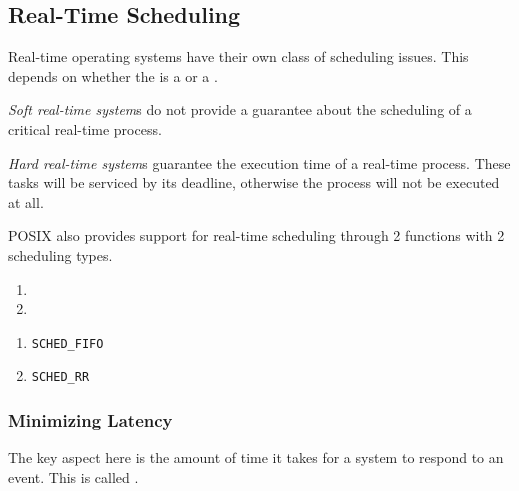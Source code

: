 \subsection{Real-Time Scheduling}\label{subsec:Real_Time_Scheduling}
Real-time operating systems have their own class of scheduling issues.
This depends on whether the  is a  or a .

\begin{definition}\label{def:Soft_Real_Time_System}
  \emph{Soft real-time system}s do not provide a guarantee about the scheduling of a critical real-time process.
\end{definition}

\begin{definition}\label{def:Hard_Real_Time_System}
  \emph{Hard real-time system}s guarantee the execution time of a real-time process.
  These tasks will be serviced by its deadline, otherwise the process will not be executed at all.
\end{definition}

POSIX also provides support for real-time scheduling through 2 functions with 2 scheduling types.
\begin{enumerate}[noitemsep]
\item {}
\item {}
\end{enumerate}
\begin{enumerate}[noitemsep]
\item \texttt{SCHED\_FIFO}
\item \texttt{SCHED\_RR}
\end{enumerate}

\subsubsection{Minimizing Latency}\label{subsubsec:Minimizing_Latency}
The key aspect here is the amount of time it takes for a system to respond to an event.
This is called .



